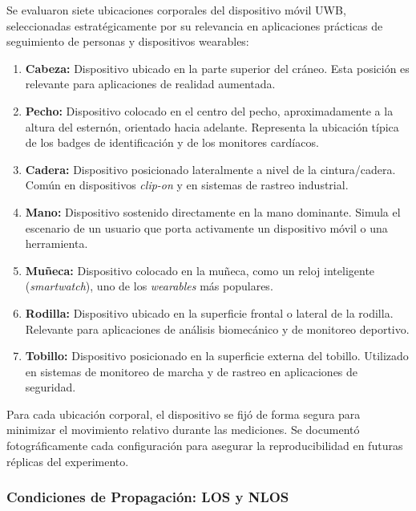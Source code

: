 Se evaluaron siete ubicaciones corporales del dispositivo móvil UWB, seleccionadas estratégicamente por su relevancia en aplicaciones prácticas de seguimiento de personas y dispositivos wearables:

\begin{enumerate}
\item \textbf{Cabeza:} Dispositivo ubicado en la parte superior del cráneo. Esta posición es relevante para aplicaciones de realidad aumentada.

\item \textbf{Pecho:} Dispositivo colocado en el centro del pecho, aproximadamente a la altura del esternón, orientado hacia adelante. Representa la ubicación típica de los badges de identificación y de los monitores cardíacos.

\item \textbf{Cadera:} Dispositivo posicionado lateralmente a nivel de la cintura/cadera. Común en dispositivos \textit{clip-on} y en sistemas de rastreo industrial.

\item \textbf{Mano:} Dispositivo sostenido directamente en la mano dominante. Simula el escenario de un usuario que porta activamente un dispositivo móvil o una herramienta.
\item \textbf{Muñeca:} Dispositivo colocado en la muñeca, como un reloj inteligente (\textit{smartwatch}), uno de los \textit{wearables} más populares.

\item \textbf{Rodilla:} Dispositivo ubicado en la superficie frontal o lateral de la rodilla. Relevante para aplicaciones de análisis biomecánico y de monitoreo deportivo.

\item \textbf{Tobillo:} Dispositivo posicionado en la superficie externa del tobillo. Utilizado en sistemas de monitoreo de marcha y de rastreo en aplicaciones de seguridad.
\end{enumerate}

Para cada ubicación corporal, el dispositivo se fijó de forma segura para minimizar el movimiento relativo durante las mediciones. Se documentó fotográficamente cada configuración para asegurar la reproducibilidad en futuras réplicas del experimento.

\subsubsection{Condiciones de Propagación: LOS y NLOS}

